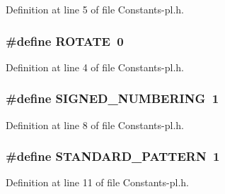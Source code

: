 Definition at line 5 of file Constants-\/pl.\-h.

\hypertarget{_constants-pl_8h_ae38c87f421906975bf7500c3b779fbd1}{
\subsubsection[{R\-O\-T\-A\-T\-E}]{\setlength{\rightskip}{0pt plus 5cm}\#define R\-O\-T\-A\-T\-E~0}}\label{_constants-pl_8h_ae38c87f421906975bf7500c3b779fbd1}


Definition at line 4 of file Constants-\/pl.\-h.

\hypertarget{_constants-pl_8h_a591937bc56bfef3fd4e606da1e9bb6e1}{
\subsubsection[{S\-I\-G\-N\-E\-D\-\_\-\-N\-U\-M\-B\-E\-R\-I\-N\-G}]{\setlength{\rightskip}{0pt plus 5cm}\#define S\-I\-G\-N\-E\-D\-\_\-\-N\-U\-M\-B\-E\-R\-I\-N\-G~1}}\label{_constants-pl_8h_a591937bc56bfef3fd4e606da1e9bb6e1}


Definition at line 8 of file Constants-\/pl.\-h.

\hypertarget{_constants-pl_8h_a5daa478426a73c9de86ceb44488ca3d8}{
\subsubsection[{S\-T\-A\-N\-D\-A\-R\-D\-\_\-\-P\-A\-T\-T\-E\-R\-N}]{\setlength{\rightskip}{0pt plus 5cm}\#define S\-T\-A\-N\-D\-A\-R\-D\-\_\-\-P\-A\-T\-T\-E\-R\-N~1}}\label{_constants-pl_8h_a5daa478426a73c9de86ceb44488ca3d8}


Definition at line 11 of file Constants-\/pl.\-h.

